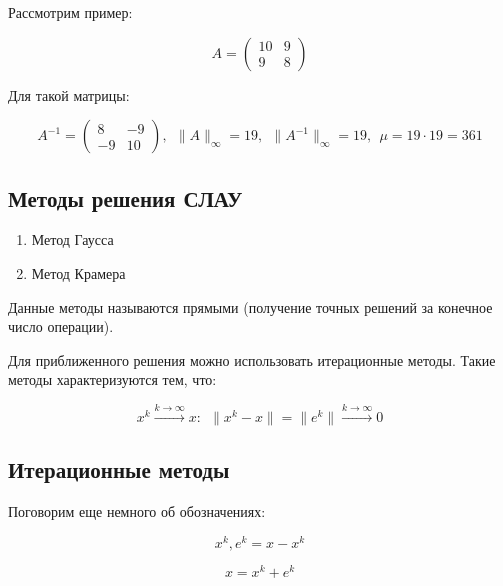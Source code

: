 \documentclass[10pt,a4paper]{article}
\begin{document}
	Рассмотрим пример:
	
	\begin{equation}
		A = 
		\begin{pmatrix}
		10 & 9
		\\
		9 & 8
		\end{pmatrix}
	\end{equation}
	
	Для такой матрицы: 
	
	\begin{equation}
		A^{-1} = 
		\begin{pmatrix}
		8 & -9
		\\
		-9 & 10
		\end{pmatrix}, \ \ \parallel A \parallel_{\infty} = 19, \ \ 
		\parallel A^{-1} \parallel_{\infty} = 19, \ \ \mu = 19 \cdot 19 = 361
	\end{equation}
	
	\subsection{Методы решения СЛАУ}
	
		\begin{enumerate}
			\item Метод Гаусса	
			\item Метод Крамера	
		\end{enumerate}
		
		Данные методы называются прямыми (получение точных решений за конечное 
		число операции).
		
		Для приближенного решения можно использовать итерационные методы.
		Такие методы характеризуются тем, что:
		
		\begin{equation}
			x^{k}\xrightarrow{k \to \infty}  x: \ \ 
			\parallel x^{k} - x \parallel = \parallel e^{k} \parallel 
			\xrightarrow{k \to \infty} 0
		\end{equation}	
		
	\subsection{Итерационные методы}	
	
		Поговорим еще немного об обозначениях:
		
		\begin{equation}
			x^{k}, e^{k} = x - x^{k}	
		\end{equation}	
		
		\begin{equation}
			x = x^{k} + e^{k}	
		\end{equation}	
		
\end{document}
